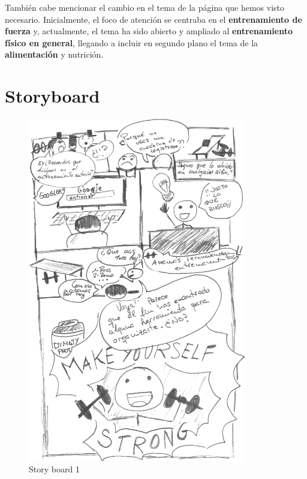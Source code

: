 \documentclass[a4paper]{article}
\begin{document}
También cabe mencionar el cambio en el tema de la página que hemos visto necesario. Inicialmente, el foco de atención se centraba en el \textbf{entrenamiento de fuerza} y, actualmente, el tema ha sido abierto y ampliado al \textbf{entrenamiento físico en general}, llegando a incluir en segundo plano el tema de la \textbf{alimentación} y nutrición.

\FloatBarrier
\section{Storyboard}

\begin{figure}[!h]
\centering
\includegraphics[width=0.85\textwidth]{./figuras/storyboard1-mas-negro.jpg}
\caption{Story board 1}
\end{figure}
\end{document}
